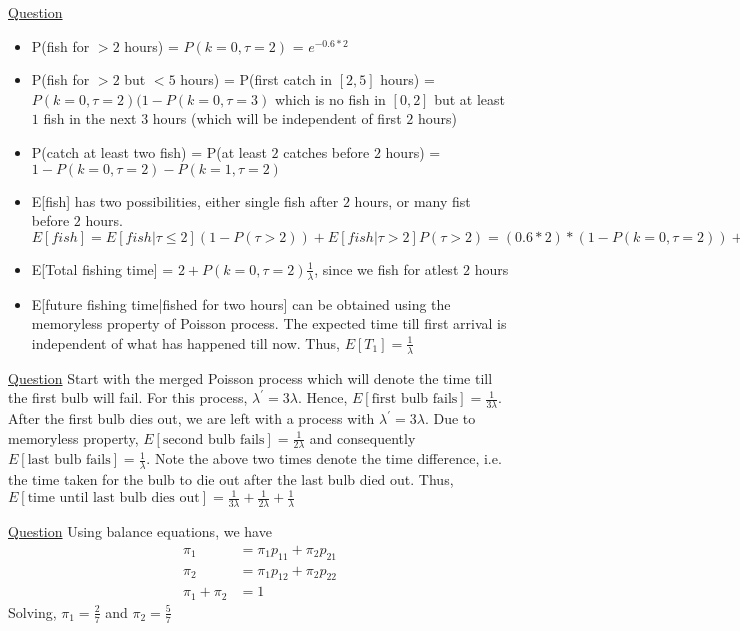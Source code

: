 \documentclass[11pt, a4paper]{article}
\begin{document}
\begin{enumerate}
        \hypertarget{a_poissonfish}{\item} \hyperlink{q_poissonfish}{Question}
        \begin{itemize}
            \item P(fish for $> 2$ hours) = $P(k=0, \tau=2)$ = $e^{-0.6 * 2}$
            \item P(fish for $> 2$ but $< 5$ hours) = P(first catch in $[2,5]$ hours) = $P(k=0,\tau=2)(1-P(k=0,\tau=3)$ which is no fish in $[0,2]$ but at least $1$ fish in the next $3$ hours (which will be independent of first $2$ hours)
            \item P(catch at least two fish) = P(at least $2$ catches before $2$ hours) = $1 - P(k=0,\tau=2) - P(k=1,\tau=2)$
            \item E[fish] has two possibilities, either single fish after $2$ hours, or many fist before $2$ hours. $E[fish] = E[fish|\tau \leq 2](1-P(\tau > 2)) + E[fish|\tau > 2] P(\tau > 2) = (0.6*2)*(1-P(k=0,\tau=2)) + 1*P(k=0,\tau=2)$
            \item E[Total fishing time] = $2 + P(k=0,\tau=2)\frac{1}{\lambda}$, since we fish for atlest $2$ hours
            \item E[future fishing time|fished for two hours] can be obtained using the memoryless property of Poisson process. The expected time till first arrival is independent of what has happened till now. Thus, $E[T_{1}] = \frac{1}{\lambda}$
        \end{itemize}

        \hypertarget{a_poissonbulb}{\item} \hyperlink{q_poissonbulb}{Question}\newline
        Start with the merged Poisson process which will denote the time till the first bulb will fail. For this process, $\lambda^{'} = 3\lambda$. Hence, $E[\text{first bulb fails}] = \frac{1}{3\lambda}$.
        After the first bulb dies out, we are left with a process with $\lambda^{'} = 3\lambda$. Due to memoryless property, $E[\text{second bulb fails}] = \frac{1}{2\lambda}$ and consequently $E[\text{last bulb fails}] = \frac{1}{\lambda}$. \newline
        Note the above two times denote the time difference, i.e. the time taken for the bulb to die out after the last bulb died out. Thus, $E[\text{time until last bulb dies out}] = \frac{1}{3\lambda} + \frac{1}{2\lambda} + \frac{1}{\lambda}$

        \hypertarget{a_steadymarkov}{\item} \hyperlink{q_steadymarkov}{Question}\newline
        Using balance equations, we have
        \begin{align*}
            \pi_{1} &= \pi_{1}p_{11} + \pi_{2}p_{21}\\
            \pi_{2} &= \pi_{1}p_{12} + \pi_{2}p_{22}\\
            \pi_{1} + \pi_{2} &= 1
        \end{align*}
        Solving, $\pi_{1} = \frac{2}{7}$ and $\pi_{2} = \frac{5}{7}$


\end{enumerate}
\end{document}
